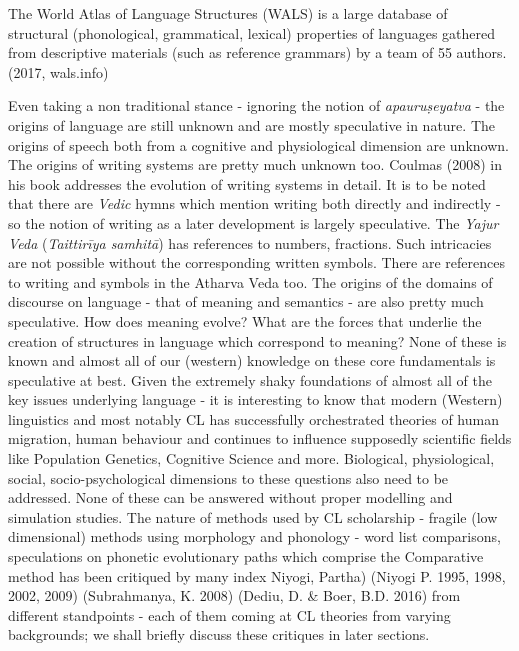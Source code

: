 \begin{myquote}
The World Atlas of Language Structures (WALS) is a large database of structural (phonological, grammatical, lexical) properties of languages gathered from descriptive materials (such as reference grammars) by a team of 55 authors. (2017, wals.info)
\end{myquote}

Even taking a non traditional stance - ignoring the notion of \textit{apauruṣeyatva} - the origins of language are still unknown and are mostly speculative in nature. The origins of speech both from a cognitive and physiological dimension are unknown. The origins of writing systems are pretty much unknown too. Coulmas (2008) in his book addresses the evolution of writing systems in detail. It is to be noted that there are \textit{Vedic} hymns which mention writing both directly and indirectly - so the notion of writing as a later development is largely speculative. The \textit{Yajur Veda} (\textit{Taittirīya samhitā}) has references to numbers, fractions. Such intricacies are not possible without the corresponding written symbols. There are references to writing and symbols in the Atharva Veda too. The origins of the domains of discourse on language - that of meaning and semantics - are also pretty much speculative. How does meaning evolve? What are the forces that underlie the creation of structures in language which correspond to meaning? None of these is known and almost all of our (western) knowledge on these core fundamentals is speculative at best. Given the extremely shaky foundations of almost all of the key issues underlying language - it is interesting to know that modern (Western) linguistics and most notably CL has successfully orchestrated theories of human migration, human behaviour and continues to influence supposedly scientific fields like Population Genetics, Cognitive Science and more. Biological, physiological, social, socio-psychological dimensions to these questions also need to be addressed. None of these can be answered without proper modelling and simulation studies. The nature of methods used by CL scholarship - fragile (low dimensional) methods using morphology and phonology - word list comparisons, speculations on phonetic evolutionary paths which comprise the Comparative method has been critiqued by many index Niyogi, Partha) (Niyogi P. 1995, 1998, 2002, 2009) (Subrahmanya, K. 2008) (Dediu, D. \& Boer, B.D. 2016) from different standpoints - each of them coming at CL theories from varying backgrounds; we shall briefly discuss these critiques in later sections.


